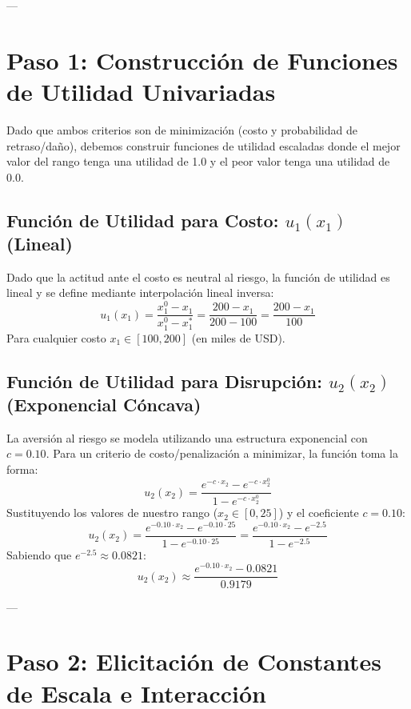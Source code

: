 \documentclass[11pt, letterpaper]{article}
\begin{document}
---

\section{Paso 1: Construcción de Funciones de Utilidad Univariadas}

Dado que ambos criterios son de minimización (costo y probabilidad de retraso/daño), debemos construir funciones de utilidad escaladas donde el mejor valor del rango tenga una utilidad de 1.0 y el peor valor tenga una utilidad de 0.0.

\subsection{Función de Utilidad para Costo: $u_1(x_1)$ (Lineal)}
Dado que la actitud ante el costo es neutral al riesgo, la función de utilidad es lineal y se define mediante interpolación lineal inversa:
\begin{equation}
    u_1(x_1) = \frac{x_1^0 - x_1}{x_1^0 - x_1^*} = \frac{200 - x_1}{200 - 100} = \frac{200 - x_1}{100}
\end{equation}
Para cualquier costo $x_1 \in [100, 200]$ (en miles de USD).

\subsection{Función de Utilidad para Disrupción: $u_2(x_2)$ (Exponencial Cóncava)}
La aversión al riesgo se modela utilizando una estructura exponencial con $c = 0.10$. Para un criterio de costo/penalización a minimizar, la función toma la forma:
\begin{equation}
    u_2(x_2) = \frac{e^{-c \cdot x_2} - e^{-c \cdot x_2^0}}{1 - e^{-c \cdot x_2^0}}
\end{equation}
Sustituyendo los valores de nuestro rango ($x_2 \in [0, 25]$) y el coeficiente $c = 0.10$:
\begin{equation}
    u_2(x_2) = \frac{e^{-0.10 \cdot x_2} - e^{-0.10 \cdot 25}}{1 - e^{-0.10 \cdot 25}} = \frac{e^{-0.10 \cdot x_2} - e^{-2.5}}{1 - e^{-2.5}}
\end{equation}
Sabiendo que $e^{-2.5} \approx 0.0821$:
\begin{equation}
    u_2(x_2) \approx \frac{e^{-0.10 \cdot x_2} - 0.0821}{0.9179}
\end{equation}

---

\section{Paso 2: Elicitación de Constantes de Escala e Interacción}
\end{document}
